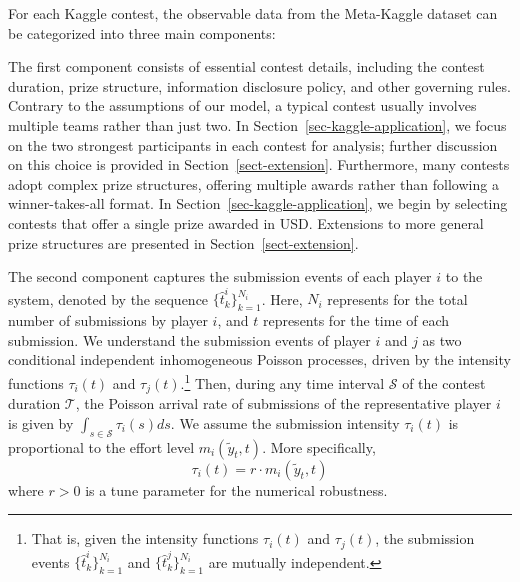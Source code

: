 \documentclass[mnsc]{informs3}
\begin{document}
For each Kaggle contest, the observable data from the Meta-Kaggle dataset can be categorized into three main components:

The first component consists of essential contest details, including the contest duration, prize structure, information disclosure policy, and other governing rules.
Contrary to the assumptions of our model, a typical contest usually involves multiple teams rather than just two.
In Section~\ref{sec-kaggle-application}, we focus on the two strongest participants in each contest for analysis; further discussion on this choice is provided in Section~\ref{sect-extension}.
Furthermore, many contests adopt complex prize structures, offering multiple awards rather than following a winner-takes-all format.
In Section~\ref{sec-kaggle-application}, we begin by selecting contests that offer a single prize awarded in USD.
Extensions to more general prize structures are presented in Section~\ref{sect-extension}.

The second component captures the submission events of each player $i$ to the system, denoted by the sequence $\{\hat{t}^i_k\}_{k=1}^{N_i}$.
Here, $N_i$ represents for the total number of submissions by player $i$, and $t$ represents for the time of each submission. 
We understand the submission events of player $i$ and $j$ as two conditional independent inhomogeneous Poisson processes, driven by the intensity functions $\tau_i(t)$ and $\tau_j(t)$.\footnote{That is, given the intensity functions $\tau_i(t)$ and $\tau_j(t)$, the submission events $\{\hat{t}^i_k\}_{k=1}^{N_i}$ and $\{\hat{t}^j_k\}_{k=1}^{N_i}$ are mutually independent.}
Then, during any time interval $\mathcal{S}$ of the contest duration $\mathcal{T}$, the Poisson arrival rate of submissions of the representative player $i$ is given by $\int_{s\in\mathcal{S}}\tau_i(s)ds$. 
We assume the submission intensity $\tau_i(t)$ is proportional to the effort level $m_i(\tilde{y}_t, t)$. More specifically, 
\begin{equation}\label{eq-model-intensity}
\tau_i(t) = r \cdot m_i(\tilde{y}_t, t)
\end{equation}
where $r>0$ is a tune parameter for the numerical robustness. 
\end{document}
